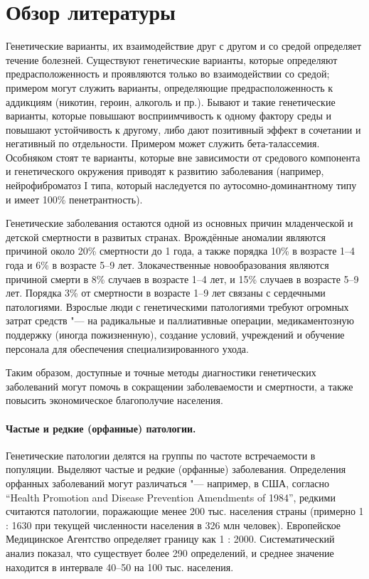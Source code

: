 \documentclass[a4paper,12pt]{article}
\begin{document}
\section{Обзор литературы}

Генетические варианты, их взаимодействие друг с другом и со средой определяет течение болезней.
Существуют генетические варианты, которые определяют предрасположенность и проявляются только во взаимодействии со средой; примером могут служить варианты, определяющие предрасположенность к аддикциям (никотин, героин, алкоголь и пр.)\cite{Hiroi_2004}.
Бывают и такие генетические варианты, которые повышают восприимчивость к одному фактору среды и повышают устойчивость к другому, либо дают позитивный эффект в сочетании и негативный по отдельности.
Примером может служить бета-талассемия\cite{Galanello_2010}.
Особняком стоят те варианты, которые вне зависимости от средового компонента и генетического окружения приводят к развитию заболевания (например, нейрофиброматоз I типа, который наследуется по аутосомно-доминантному типу и имеет 100\% пенетрантность\cite{Jett_2009}).

Генетические заболевания остаются одной из основных причин младенческой и детской смертности в развитых странах.
Врождённые аномалии являются причиной около 20\% смертности до 1 года, а также порядка 10\% в возрасте 1--4 года и 6\% в возрасте 5--9 лет.
Злокачественные новообразования являются причиной смерти в 8\% случаев в возрасте 1--4 лет, и 15\% случаев в возрасте 5--9 лет.
Порядка 3\% от смертности в возрасте 1--9 лет связаны с сердечными патологиями\cite{Field_2003}.
Взрослые люди с генетическими патологиями требуют огромных затрат средств "--- на радикальные и паллиативные операции, медикаментозную поддержку (иногда пожизненную), создание условий, учреждений и обучение персонала для обеспечения специализированного ухода.

Таким образом, доступные и точные методы диагностики генетических заболеваний могут помочь в сокращении заболеваемости и смертности, а также повысить экономическое благополучие населения.

\paragraph{Частые и редкие (орфанные) патологии.}
Генетические патологии делятся на группы по частоте встречаемости в популяции.
Выделяют частые и редкие (орфанные) заболевания.
Определения орфанных заболеваний могут различаться "--- например, в США, согласно ``Health Promotion and Disease Prevention Amendments of 1984'', редкими считаются патологии, поражающие менее 200 тыс. населения страны (примерно 1 : 1630 при текущей численности населения в 326 млн человек)\cite{Herder_2017}.
Европейское Медицинское Агентство определяет границу как 1 : 2000.
Систематический анализ показал, что существует более 290 определений, и среднее значение находится в интервале 40--50 на 100 тыс. населения\cite{Richter_2015}.
\end{document}
